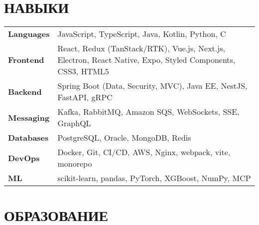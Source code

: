 \documentclass[11pt,a4paper]{moderncv}
\begin{document}
\vspace{-1em}

\section{НАВЫКИ}
{\renewcommand{\arraystretch}{1.05}
\setlength{\tabcolsep}{4pt} %
\begin{tabularx}{\linewidth}{@{}>{\bfseries}l >{}X@{}}
Languages & JavaScript, TypeScript, Java, Kotlin, Python, C \\ [0.25em]
Frontend  & React, Redux (TanStack/RTK), Vue.js, Next.js, Electron, React Native, Expo, Styled Components, CSS3, HTML5 \\ [0.25em]
Backend   & Spring Boot (Data, Security, MVC), Java EE, NestJS, FastAPI, gRPC \\ [0.25em]
Messaging & Kafka, RabbitMQ, Amazon SQS, WebSockets, SSE, GraphQL \\ [0.25em]
Databases & PostgreSQL, Oracle, MongoDB, Redis\\ [0.25em]
DevOps    & Docker, Git, CI/CD, AWS, Nginx, webpack, vite, monorepo \\ [0.25em]
ML & scikit-learn, pandas, PyTorch, XGBoost, NumPy, MCP
\end{tabularx}
}
\section{ОБРАЗОВАНИЕ}
\vspace{0.5em}
\newlength{\EduGap}
\setlength{\EduGap}{4mm}
\end{document}

